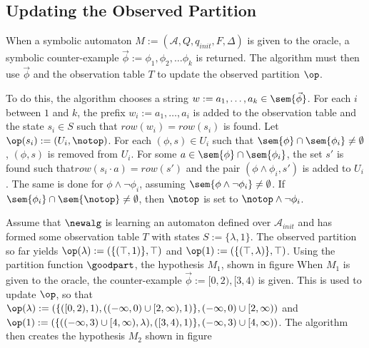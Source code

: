 \subsection{Updating the Observed Partition}

When a symbolic automaton $M := (\mathcal{A}, Q, q_{init}, F, \Delta)$ is given to the oracle, a symbolic counter-example $\vec{\phi} := \phi_1, \phi_2, \dots \phi_k $ is returned. 
The algorithm must then use $\vec{\phi}$ and the observation table $T$ to update the observed partition $\op$. 

To do this, the algorithm chooses a string $w := a_1,\dots, a_k \in \sem{\vec{\phi}}$. 
For each $i$ between $1$ and $k$, the prefix $w_i := a_1, \dots, a_i$ is added to the observation table and the state $s_i \in S$ such that $row(w_i) = row(s_i)$ is found.
Let $\op(s_i) := (U_i, \notop)$.
For each $(\phi, s) \in U_i$ such that $\sem{\phi} \cap \sem{\phi_i} \ne \emptyset$,  $(\phi, s)$ is removed from $U_i$.
For some $a \in \sem{\phi} \cap \sem{\phi_i}$, the set $s'$ is found  such that$row(s_i \cdot a) = row(s')$ and the pair $(\phi \wedge \phi_i, s')$ is added to $U_i$.
The same is done for $\phi \wedge \neg\phi_i$, assuming $\sem{\phi \wedge \neg\phi_i} \ne \emptyset$.
If $\sem{\phi_i} \cap \sem{\notop} \ne \emptyset$, then $\notop$ is set to $\notop \wedge \neg\phi_i$. 


\begin{example}
Assume that $\newalg$ is learning an automaton defined over $\mathcal{A}_{init}$ and has formed some observation table $T$ with states $S := \{ \lambda, 1 \}$.
The observed partition so far yields $\op(\lambda) := ( \{ (\top, 1) \}, \top)$ and $\op(1) := ( \{ (\top, \lambda) \}, \top)$.  
Using the partition function $\goodpart$, the hypothesis $M_1$, shown in figure %
When $M_1$ is given to the oracle, the counter-example $\vec{\phi} := [0,2),[3,4)$ is given. 
This is used to update $\op$, so that $\op(\lambda) := ( \{ ([0,2), 1), ((-\infty,0)\cup[2,\infty),1) \}, (-\infty,0)\cup[2,\infty))$ and $\op(1) := ( \{ ((-\infty,3)\cup[4,\infty), \lambda), ([3,4), 1)  \}, (-\infty,3)\cup[4,\infty) )$.
The algorithm then creates the hypothesis $M_2$ shown in figure %
\end{example}



